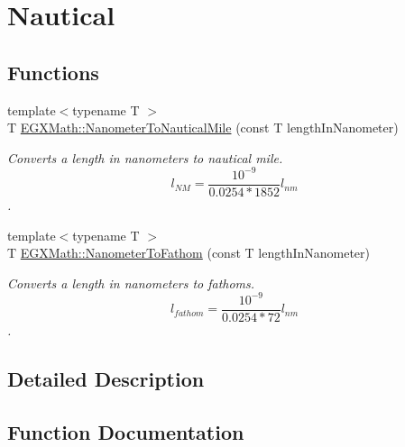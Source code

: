 \hypertarget{group___e_g_x_math-_conversions-_length_conversions-_s_i-_nanometer-_nautical}{}\section{Nautical}
\label{group___e_g_x_math-_conversions-_length_conversions-_s_i-_nanometer-_nautical}
\subsection*{Functions}
\begin{DoxyCompactItemize}
\item 
{\footnotesize template$<$typename T $>$ }\\T \mbox{\hyperlink{group___e_g_x_math-_conversions-_length_conversions-_s_i-_nanometer-_nautical_gac428c495bff87ba53c856395a7410fc3}{E\+G\+X\+Math\+::\+Nanometer\+To\+Nautical\+Mile}} (const T length\+In\+Nanometer)
\begin{DoxyCompactList}\small\item\em Converts a length in nanometers to nautical mile. \[ l_{NM}= \frac{10^{-9}}{0.0254 * 1852} l_{nm} \]. \end{DoxyCompactList}\item 
{\footnotesize template$<$typename T $>$ }\\T \mbox{\hyperlink{group___e_g_x_math-_conversions-_length_conversions-_s_i-_nanometer-_nautical_ga934c7c5c17c283b51e1551b9731f05b6}{E\+G\+X\+Math\+::\+Nanometer\+To\+Fathom}} (const T length\+In\+Nanometer)
\begin{DoxyCompactList}\small\item\em Converts a length in nanometers to fathoms. \[ l_{fathom}= \frac{10^{-9}}{0.0254 * 72} l_{nm} \]. \end{DoxyCompactList}\end{DoxyCompactItemize}


\subsection{Detailed Description}


\subsection{Function Documentation}
\mbox{\label{group___e_g_x_math-_conversions-_length_conversions-_s_i-_nanometer-_nautical_ga934c7c5c17c283b51e1551b9731f05b6}} 
